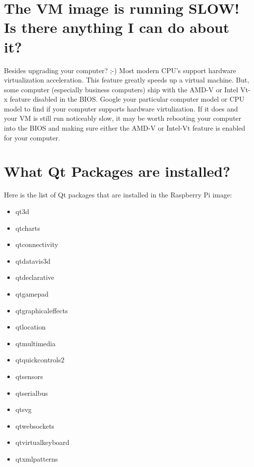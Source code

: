 \documentclass{article}
\begin{document}
\section{The VM image is running SLOW! Is there anything I can do about it?}

Besides upgrading your computer? ;-) Most modern CPU's support hardware virtualization acceleration. This feature greatly speeds up a virtual machine. But, some computer (especially business computers) ship with the AMD-V or Intel Vt-x feature disabled in the BIOS. Google your particular computer model or CPU model to find if your computer supports hardware virtulization. If it does and your VM is still run noticeably slow, it may be worth rebooting your computer into the BIOS and making sure either the AMD-V or Intel-Vt feature is enabled for your computer. 


\section{What Qt Packages are installed?}

Here is the list of Qt packages that are installed in the Raspberry Pi image:

	\begin{itemize}
		
		\item qt3d
		\item qtcharts
		\item qtconnectivity
		\item qtdatavis3d
		\item qtdeclarative
		\item qtgamepad
		\item qtgraphicaleffects
		\item qtlocation
		\item qtmultimedia
		\item qtquickcontrols2
		\item qtsensors
		\item qtserialbus
		\item qtsvg
		\item qtwebsockets
		\item qtvirtualkeyboard
		\item qtxmlpatterns
		
	\end{itemize}
\end{document}
